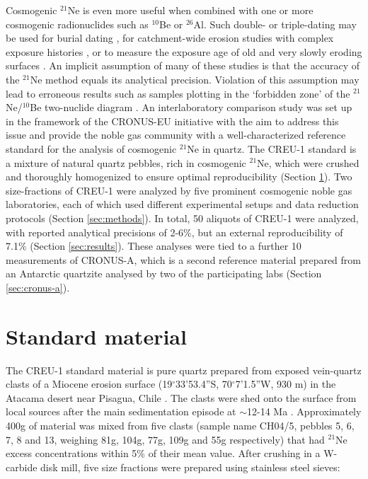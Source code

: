 \documentclass[authoryear,review,12pt]{elsarticle}
\begin{document}
Cosmogenic $^{21}$Ne is even more useful when combined with one or
more cosmogenic radionuclides such as $^{10}$Be or $^{26}$Al. Such
double- or triple-dating may be used for burial dating
\citep{balco2009b, vermeesch2010b}, for catchment-wide erosion studies
with complex exposure histories \citep{kober2009}, or to measure the
exposure age of old and very slowly eroding surfaces
\citep{fujioka2005}. An implicit assumption of many of these studies
is that the accuracy of the $^{21}$Ne method equals its analytical
precision.  Violation of this assumption may lead to erroneous results
such as samples plotting in the `forbidden zone' of the
$^{21}$Ne/$^{10}$Be two-nuclide diagram \citep{lal1991, kober2011}. An
interlaboratory comparison study was set up in the framework of the
CRONUS-EU initiative \citep{stuart2009} with the aim to address this
issue and provide the noble gas community with a well-characterized
reference standard for the analysis of cosmogenic $^{21}$Ne in
quartz. The CREU-1 standard is a mixture of natural quartz pebbles,
rich in cosmogenic $^{21}$Ne, which were crushed and thoroughly
homogenized to ensure optimal reproducibility (Section
\ref{sec:sampleprep}).  Two size-fractions of CREU-1 were analyzed by
five prominent cosmogenic noble gas laboratories, each of which used
different experimental setups and data reduction protocols (Section
\ref{sec:methods}). In total, 50 aliquots of CREU-1 were analyzed,
with reported analytical precisions of 2-6\%, but an external
reproducibility of 7.1\% (Section \ref{sec:results}). These analyses
were tied to a further 10 measurements of CRONUS-A, which is a second
reference material prepared from an Antarctic quartzite analysed by
two of the participating labs (Section \ref{sec:cronus-a}).

\section{Standard material}
\label{sec:sampleprep}

The CREU-1 standard material is pure quartz prepared from exposed
vein-quartz clasts of a Miocene erosion surface
(19$^{\circ}$33'53.4''S, 70$^{\circ}$7'1.5''W, 930 m) in the Atacama
desert near Pisagua, Chile \citep[between sites B and C
  of][]{dunai2005}.  The clasts were shed onto the surface from local
sources after the main sedimentation episode at $\sim$12-14 Ma
\citep{dunai2005}.  Approximately 400g of material was mixed from five
clasts (sample name CH04/5, pebbles 5, 6, 7, 8 and 13, weighing 81g,
104g, 77g, 109g and 55g respectively) that had $^{21}$Ne excess
concentrations within 5\% of their mean value. After crushing in a
W-carbide disk mill, five size fractions were prepared using stainless
steel sieves:
\end{document}
